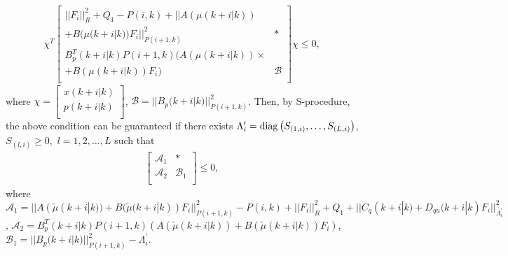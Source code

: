 \documentclass{singlecol-new}
\theoremstyle{TH}{
\newtheorem{lemma}{Lemma}
\newtheorem{theorem}[lemma]{Theorem}
\newtheorem{corrolary}[lemma]{Corrolary}
\newtheorem{conjecture}[lemma]{Conjecture}
\newtheorem{proposition}[lemma]{Proposition}
\newtheorem{claim}[lemma]{Claim}
\newtheorem{stheorem}[lemma]{Wrong Theorem}
\newtheorem{algorithm}{Algorithm}
}
\theoremstyle{THrm}{
\newtheorem{definition}{Definition}[section]
\newtheorem{question}{Question}[section]
\newtheorem{remark}{Remark}
\newtheorem{scheme}{Scheme}
}
\theoremstyle{THhit}{
\newtheorem{case}{Case}[section]
}
\begin{document}
\begin{eqnarray}
\chi^T \left[{\begin{array}{ll}
 ||F_i||^2_R  + Q_1 - P(i,k)+||A(\mu (k + i|k))\\ + B(\mu (k + i|k))F_i||^2_{P(i + 1,k)}  &  *   \\
 B_p^T (k + i|k)P(i + 1,k)(A(\mu (k + i|k))\times\\ + B(\mu (k + i|k))F_i )& \mathscr{B} \\
 \end{array}}\right]\chi \leq0,\nonumber
\end{eqnarray}
where $\chi=\left[{\begin{array}{c}
   {x(k + i|k)}  \\
   {p(k + i|k)}  \\
\end{array}} \right]$, $\mathscr{B}=||B_p(k + i|k)||^2_{P(i +
1,k)}$.
Then, by S-procedure, the above condition can be guaranteed if there
exists $\Lambda _{i}^{\prime}  = {\rm diag}\left(
{S_{(1,i)},\ldots,S_{(L,i)} } \right)$, $S_{(l,i)}  \ge 0,$ \h{$l =
1,2, \ldots ,L$ such that}
\begin{eqnarray}
\left[ {\begin{array}{cc}
   \mathscr{A}_1 &  *   \\
   \mathscr{A}_2 & \mathscr{B}_1  \\
\end{array}} \right]\leq 0,\nonumber
\end{eqnarray}
where $\mathscr{A}_1= ||A(\tilde \mu (k + i|k)) + B(\tilde \mu (k +
i|k))F_i||^2_{P(i + 1,k)} - P(i,k) + ||F_i||^2_R + Q_1  + ||C_q (k +
i|k) + D_{qu} (k + i|k)F_i ||^2_{\Lambda _{i}^{\prime}}$,
 $\mathscr{A}_2=B_p^T (k + i|k)P(i + 1,k)(A(\tilde \mu (k + i|k)) + B(\tilde \mu
(k + i|k))F_i )$, $\mathscr{B}_1=||B_p(k + i|k)||^2_{P(i +
1,k)}-\Lambda _{i}^{\prime}$.
\end{document}
